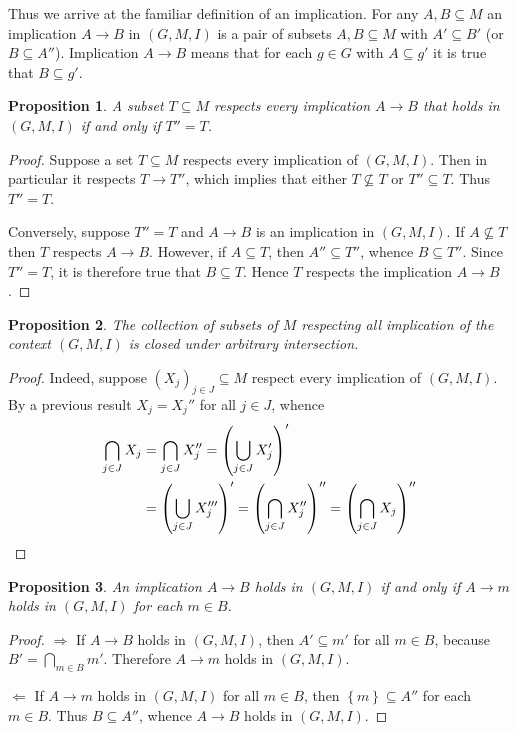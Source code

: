 \documentclass[a4paper]{article}
\newcommand{\obj}[1]{{\left\{ #1 \right \}}}
\newcommand{\brac}[1]{{\left ( #1 \right )}}
\newtheorem{prop}{Proposition}
\begin{document}
Thus we arrive at the familiar definition of an implication. For any $A,B\subseteq M$ an implication $A\to B$ in $(G,M,I)$ is a pair of subsets $A,B\subseteq M$ with $A'\subseteq B'$ (or $B\subseteq A''$). Implication $A\to B$ means that for each $g\in G$ with $A\subseteq g'$ it is true that $B\subseteq g'$.

\begin{prop} A subset $T\subseteq M$ respects every implication $A\to B$ that holds in $(G,M,I)$ if and only if $T''=T$.
\end{prop}

\begin{proof}
Suppose a set $T\subseteq M$ respects every implication of $(G,M,I)$. Then in particular it respects $T\to T''$, which implies that either $T\not\subseteq T$ or $T''\subseteq T$. Thus $T''=T$.

Conversely, suppose $T''=T$ and $A\to B$ is an implication in $(G,M,I)$. If $A\not\subseteq T$ then $T$ respects $A\to B$. However, if $A\subseteq T$, then $A''\subseteq T''$, whence $B\subseteq T''$. Since $T''=T$, it is therefore true that $B\subseteq T$. Hence $T$ respects the implication $A\to B$.
\end{proof}

\begin{prop} The collection of subsets of $M$ respecting all implication of the context $(G,M,I)$ is closed under arbitrary intersection.
\end{prop}

\begin{proof}
Indeed, suppose $\brac{X_j}_{j\in J}\subseteq M$ respect every implication of $(G,M,I)$. By a previous result $X_j = X_j''$ for all $j\in J$, whence \begin{align*}
\bigcap_{j\in J} X_j & = \bigcap_{j\in J} X_j'' = \brac{\bigcup_{j\in J} X_j'}' \\ &= \brac{\bigcup_{j\in J} X_j'''}' = \brac{\bigcap_{j\in J} X_j''}'' = \brac{\bigcap_{j\in J} X_j}'' \qedhere
\end{align*}
\end{proof}

\begin{prop} An implication $A\to B$ holds in $(G,M,I)$ if and only if $A\to m$ holds in $(G,M,I)$ for each $m\in B$.
\end{prop}

\begin{proof}
$\Rightarrow$ If $A\to B$ holds in $(G,M,I)$, then $A'\subseteq m'$ for all $m\in B$, because $B' = \bigcap_{m\in B} m'$. Therefore $A\to m$ holds in $(G,M,I)$.

$\Leftarrow$ If $A\to m$ holds in $(G,M,I)$ for all $m\in B$, then $\obj{m}\subseteq A''$ for each $m\in B$. Thus $B\subseteq A''$, whence $A\to B$ holds in $(G,M,I)$.
\end{proof}
\end{document}
